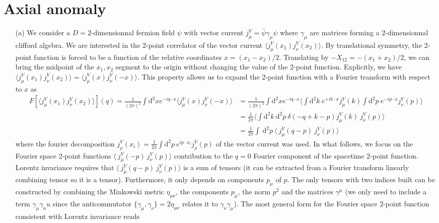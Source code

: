 \documentclass[10pt, a4paper]{article}
\begin{document}
{\begin{enumerate}
\end{enumerate}


\newpage
\section{Axial anomaly}

\begin{enumerate}
  \item[(a)] We consider a $D=2$-dimensionnal fermion field $\psi$ with vector current $j_{\mu}^V = \bar{\psi} \gamma_{\mu} \psi$ where $\gamma_\mu$ are matrices forming a 2-dimensionnal clifford algebra. We are interested in the 2-point correlator of the vector current $\langle j_{\mu}^{V}(x_1) j_{\nu}^{V}(x_2) \rangle$. By translational symmetry, the 2-point function is forced to be a function of the relative coordinates $x = (x_1-x_2)/2$. Translating by $-X_{12} = -(x_1 + x_2)/2$, we can bring the midpoint of the $x_1, x_2$ segment to the origin without changing the value of the 2-point function. Explicitly, we have $\langle j_{\mu}^{V}(x_1) j_{\nu}^{V}(x_2) \rangle = \langle j_{\mu}^{V}(x) j_{\nu}^{V}(-x) \rangle$. This property allows us to expand the 2-point function with a Fourier transform with respect to $x$ as 
  \begin{align*}
    F[\langle j_{\mu}^{V}(x_1) j_{\nu}^{V}(x_2) \rangle](q)  = \frac{1}{(2\pi)^2}\int \text{d}^2x e^{-i q \cdot  x} \langle j_{\mu}^{V}(x) j_{\nu}^{V}(-x) \rangle &= \frac{1}{(2\pi)^2}\int \text{d}^2x e^{-i q \cdot  x} \langle  \int \text{d}^2 k\  e^{+i k \cdot x} j_{\mu}^{V}(k) \int \text{d}^2 p\  e^{-i p \cdot x} j_{\nu}^{V}(p) \rangle\\
    &=  \frac{1}{2\pi} \langle  \int \text{d}^2 k\ \text{d}^2 p\ \delta(-q + k - p)  j_{\mu}^{V}(k) \  j_{\nu}^{V}(p) \rangle\\
    &= \frac{1}{2\pi}\int \ \text{d}^2 p \ \langle \ j_{\mu}^{V}(q-p) \ j_{\nu}^{V}(p) \rangle
  \end{align*}
  where the fourier decomposition $j_{\rho}^{V}(x_i) = \frac{1}{2\pi} \int \text{d}^2 p\ e^{i p \cdot x_i} j_{\rho}^{V}(p)$ of the vector current was used. In what follows, we focus on the Fourier space 2-point functions $\langle \ j_{\mu}^{V}(-p) \ j_{\nu}^{V}(p) \rangle$ contribution to the $q = 0$ Fourier component of the spacetime 2-point function. Lorentz invariance requires that $\langle \ j_{\mu}^{V}(q-p) \ j_{\nu}^{V}(p) \rangle$ is a sum of tensors (it can be extracted from a Fourier transform linearly combining tensor so it is a tensor). Furthermore, it only depends on components $p_\mu$ of $p$. The only tensors with two indices built can be constructed by combining the Minkowski metric $\eta_{\mu\nu}$, the components  $p_\mu$, the norm $p^2$ and the matrices $\gamma^\mu$ (we only need to include a term $\gamma_\mu \gamma_nu$ since the anticommutator $\{\gamma_\mu, \gamma_\nu\} = 2 \eta_{\mu \nu}$ relates it to $\gamma_\nu \gamma_\mu$). The most general form for the Fourier space 2-point function consistent with Lorentz invariance reads 

\end{enumerate}}
\end{document}

